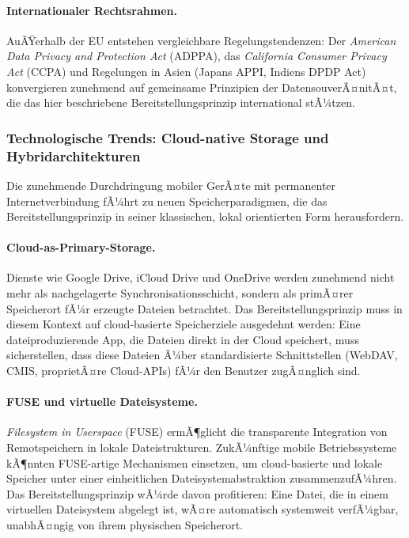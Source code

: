 ﻿\documentclass[12pt, a4paper]{article}
\begin{document}
\paragraph{Internationaler Rechtsrahmen.}
AuÃŸerhalb der EU entstehen vergleichbare Regelungstendenzen: Der \emph{American Data
Privacy and Protection Act} (ADPPA), das \emph{California Consumer Privacy Act} (CCPA)
und Regelungen in Asien (Japans APPI, Indiens DPDP Act) konvergieren zunehmend auf
gemeinsame Prinzipien der DatensouverÃ¤nitÃ¤t, die das hier beschriebene Bereitstellungs\-prinzip
international stÃ¼tzen.

\subsubsection{Technologische Trends: Cloud-native Storage und Hybridarchitekturen}

Die zunehmende Durchdringung mobiler GerÃ¤te mit permanenter Internetverbindung fÃ¼hrt
zu neuen Speicherparadigmen, die das Bereitstellungsprinzip in seiner klassischen,
lokal orientierten Form herausfordern.

\paragraph{Cloud-as-Primary-Storage.}
Dienste wie Google Drive, iCloud Drive und OneDrive werden zunehmend nicht mehr als
nachgelagerte Synchronisationsschicht, sondern als primÃ¤rer Speicherort fÃ¼r erzeugte
Dateien betrachtet. Das Bereitstellungsprinzip muss in diesem Kontext auf cloud-basierte
Speicherziele ausgedehnt werden: Eine dateiproduzierende App, die Dateien direkt in der
Cloud speichert, muss sicherstellen, dass diese Dateien Ã¼ber standardisierte
Schnittstellen (WebDAV, CMIS, proprietÃ¤re Cloud-APIs) fÃ¼r den Benutzer zugÃ¤nglich sind.

\paragraph{FUSE und virtuelle Dateisysteme.}
\emph{Filesystem in Userspace} (FUSE) ermÃ¶glicht die transparente Integration von
Remotspeichern in lokale Dateistrukturen. ZukÃ¼nftige mobile Betriebssysteme kÃ¶nnten
FUSE-artige Mechanismen einsetzen, um cloud-basierte und lokale Speicher unter einer
einheitlichen Dateisystemabstraktion zusammenzufÃ¼hren. Das Bereitstellungsprinzip wÃ¼rde
davon profitieren: Eine Datei, die in einem virtuellen Dateisystem abgelegt ist, wÃ¤re
automatisch systemweit verfÃ¼gbar, unabhÃ¤ngig von ihrem physischen Speicherort.
\end{document}
